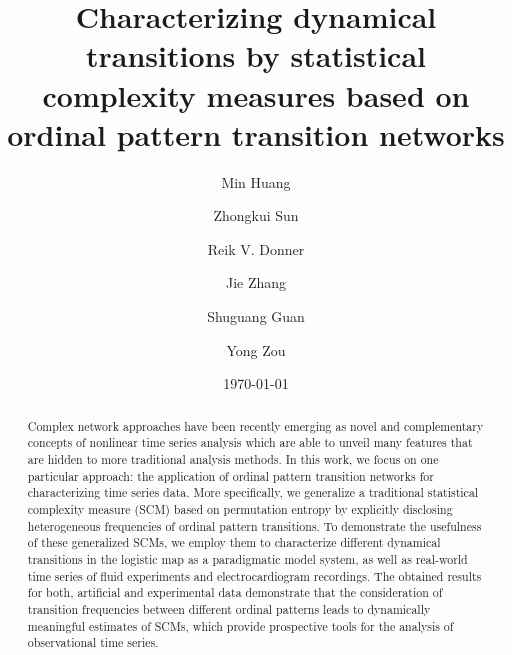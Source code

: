 \documentclass[aip,cha,reprint,nofootinbib]{revtex4-1}
\begin{document}
\title{Characterizing dynamical transitions by statistical complexity measures based on ordinal pattern transition networks} 

\author{Min Huang}

\author{Zhongkui Sun}

\author{Reik V. Donner}

\author{Jie Zhang}

\author{Shuguang Guan}
	
\author{Yong Zou}

\date{\today}

\begin{abstract}
Complex network approaches have been recently emerging as novel and complementary concepts of nonlinear time series analysis which are able to unveil many features that are hidden to more traditional analysis methods. In this work, we focus on one particular approach: the application of ordinal pattern transition networks for characterizing time series data. More specifically, we generalize a traditional statistical complexity measure (SCM) based on permutation entropy by explicitly disclosing heterogeneous frequencies of ordinal pattern transitions. To demonstrate the usefulness of these generalized SCMs, we employ them to characterize different dynamical transitions in the logistic map as a paradigmatic model system, as well as real-world time series of fluid experiments and electrocardiogram recordings. The obtained results for both, artificial and experimental data demonstrate that the consideration of transition frequencies between different ordinal patterns leads to dynamically meaningful estimates of SCMs, which provide prospective tools for the analysis of observational time series. 
\end{abstract}
\end{document}

